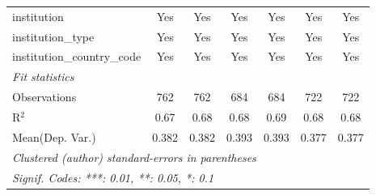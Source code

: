 \begin{tabular}{lcccccc}
   institution                        & Yes          & Yes           & Yes     & Yes     & Yes        & Yes\\  
   institution\_type                  & Yes          & Yes           & Yes     & Yes     & Yes        & Yes\\  
   institution\_country\_code         & Yes          & Yes           & Yes     & Yes     & Yes        & Yes\\  
   \midrule
   \emph{Fit statistics}\\
   Observations                       & 762          & 762           & 684     & 684     & 722        & 722\\  
   R$^2$                              & 0.67         & 0.68          & 0.68    & 0.69    & 0.68       & 0.68\\  
Mean(Dep. Var.) & 0.382 & 0.382 & 0.393 & 0.393 & 0.377 & 0.377 \\
   \midrule \midrule
   \multicolumn{7}{l}{\emph{Clustered (author) standard-errors in parentheses}}\\
   \multicolumn{7}{l}{\emph{Signif. Codes: ***: 0.01, **: 0.05, *: 0.1}}\\
\end{tabular}
\par\endgroup
